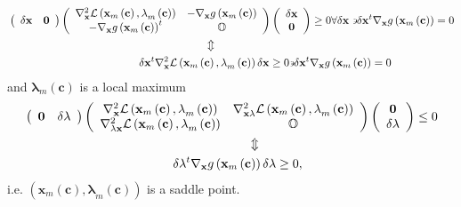 \documentclass[aps,preprint]{revtex4}%
\begin{document}
\begin{align}
&  \left(
\begin{array}
[c]{cc}%
\delta\mathbf{x} & \mathbf{0}%
\end{array}
\right)  \left(
\begin{array}
[c]{cc}%
\nabla_{\mathbf{x}}^{2}\mathcal{L}\left(  \mathbf{x}_{m}\left(  \mathbf{c}%
\right)  \mathbf{,\lambda}_{m}\left(  \mathbf{c}\right)  \right)  &
-\nabla_{\mathbf{x}}g\left(  \mathbf{x}_{m}\left(  \mathbf{c}\right)  \right)
\\
-\nabla_{\mathbf{x}}g\left(  \mathbf{x}_{m}\left(  \mathbf{c}\right)  \right)
^{t} & \mathbb{O}%
\end{array}
\right)  \left(
\begin{array}
[c]{c}%
\delta\mathbf{x}\\
\mathbf{0}%
\end{array}
\right)  \geq0\forall\delta\mathbf{x\backepsilon}\delta\mathbf{x}^{t}%
\nabla_{\mathbf{x}}g\left(  \mathbf{x}_{m}\left(  \mathbf{c}\right)  \right)
=0\nonumber\\
&  \qquad\qquad\qquad\qquad\qquad\qquad\qquad\qquad\qquad\Updownarrow
\nonumber\\
&  \qquad\qquad\qquad\qquad\qquad\qquad\delta\mathbf{x}^{t}\nabla_{\mathbf{x}%
}^{2}\mathcal{L}\left(  \mathbf{x}_{m}\left(  \mathbf{c}\right)
\mathbf{,\lambda}_{m}\left(  \mathbf{c}\right)  \right)  \delta\mathbf{x}%
\geq0\mathbf{\backepsilon}\delta\mathbf{x}^{t}\nabla_{\mathbf{x}}g\left(
\mathbf{x}_{m}\left(  \mathbf{c}\right)  \right)  =0
\end{align}
and $\mathbf{\lambda}_{m}\left(  \mathbf{c}\right)  $ is a local maximum
\begin{align}
&  \left(
\begin{array}
[c]{cc}%
\mathbf{0} & \delta\mathbf{\lambda}%
\end{array}
\right)  \left(
\begin{array}
[c]{cc}%
\nabla_{\mathbf{x}}^{2}\mathcal{L}\left(  \mathbf{x}_{m}\left(  \mathbf{c}%
\right)  \mathbf{,\lambda}_{m}\left(  \mathbf{c}\right)  \right)  &
\nabla_{\mathbf{x\lambda}}^{2}\mathcal{L}\left(  \mathbf{x}_{m}\left(
\mathbf{c}\right)  \mathbf{,\lambda}_{m}\left(  \mathbf{c}\right)  \right) \\
\nabla_{\mathbf{\lambda x}}^{2}\mathcal{L}\left(  \mathbf{x}_{m}\left(
\mathbf{c}\right)  \mathbf{,\lambda}_{m}\left(  \mathbf{c}\right)  \right)  &
\mathbb{O}%
\end{array}
\right)  \left(
\begin{array}
[c]{c}%
\mathbf{0}\\
\delta\mathbf{\lambda}%
\end{array}
\right)  \leq0\nonumber\\
&  \qquad\qquad\qquad\qquad\qquad\qquad\qquad\qquad\qquad\Updownarrow
\nonumber\\
&  \qquad\qquad\qquad\qquad\qquad\qquad\delta\mathbf{\lambda}^{t}%
\nabla_{\mathbf{x}}g\left(  \mathbf{x}_{m}\left(  \mathbf{c}\right)  \right)
\delta\mathbf{\lambda}\geq0,
\end{align}
i.e. $\left(  \mathbf{x}_{m}\left(  \mathbf{c}\right)  \mathbf{,\lambda}%
_{m}\left(  \mathbf{c}\right)  \right)  $ is a saddle point.
\end{document}
